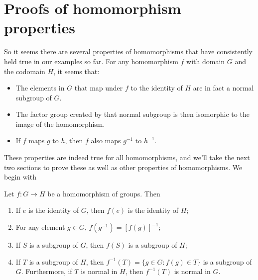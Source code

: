 \section{Proofs of homomorphism properties}

So it seems there are several properties of homomorphisms that have consistently held true in our examples so far.  
For any  homomorphism $f$ with domain $G$ and the codomain $H$, it seems that:


\begin{itemize}
\item
The elements in $G$ that map under $f$ to the identity of $H$ are in fact a normal subgroup of $G$.
\item
The factor group created by that normal subgroup is then isomorphic to the image of the homomorphism.
\item
If $f$ maps $g$ to $h$, then $f$ also maps $g^{-1}$ to $h^{-1}$.
\end{itemize}

These properties are indeed true for all homomorphisms, and we'll take the next two sections to prove these as well as other properties of homomorphisms.  
We begin with 
 
\begin{thm}\label{HomorphismSubgroupProp}
Let $f : G \rightarrow H$ be a homomorphism of groups. Then 
\begin{enumerate}
 
\item
If $e$ is the identity of $G$, then $f( e)$ is the identity of
$H$;  
 
\item
For any element $g \in G$, $f( g^{-1}) = [f( g )]^{- 1}$;
 
\item
If $S$ is a subgroup of $G$, then $f(S )$ is a subgroup of
$H$;
 
\item \label{normal_kernel}
If $T$ is a  subgroup of $H$, then $f^{-1}(T) = \{ g \in G :
f(g) \in T \}$ is a subgroup of $G$. Furthermore, if $T$ is
normal in $H$, then $f^{-1}(T)$ is normal in $G$. 
 
\end{enumerate}
\end{thm}
 
